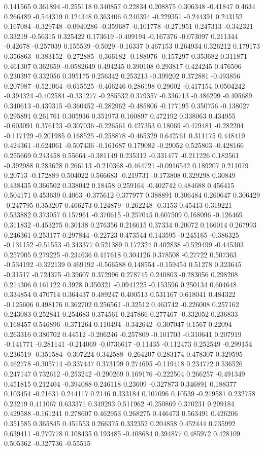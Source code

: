0.141565 0.361894 -0.255118 0.340857 0.22834 0.208875 0.306348 -0.41847 0.4634 0.266489 -0.544319 0.124348 0.363406 0.240394 -0.229351 -0.244391 0.243152 0.167084 -0.329748 -0.0940286 -0.359687 -0.101778 -0.271951 0.247313 -0.342321 0.33219 -0.56315 0.325422 0.173619 -0.409194 -0.167376 -0.073097 0.211344 -0.42678 -0.257039 0.155539 -0.5029 -0.16337 0.467153 0.264934 0.326212 0.179173 0.356863 -0.383152 -0.272885 -0.366182 -0.188076 -0.157297 0.353682 0.311871 0.461307 0.362659 -0.0582649 0.494245 0.390108 0.293817 0.424245 0.476506 0.230397 0.332056 0.395175 0.256342 0.253213 -0.399202 0.372881 -0.493856 0.207987 -0.521064 -0.615525 -0.466246 0.286198 0.29602 -0.417154 0.0504242 -0.394324 -0.402584 -0.331277 -0.285532 0.379357 -0.336713 -0.486299 -0.405689 0.340613 -0.439315 -0.360452 -0.282962 -0.485806 -0.177195 0.350756 -0.138027 0.295891 0.261761 0.305936 0.351973 0.160897 0.472192 0.338063 0.434955 -0.603091 0.376123 -0.307036 -0.226561 0.427353 0.18069 -0.479481 -0.282204 -0.117129 -0.201985 0.168525 -0.258878 -0.465329 0.642761 0.311175 0.448419 0.424361 -0.624061 -0.507436 -0.161687 0.179082 -0.29052 0.525803 -0.428166 0.255669 0.243458 0.55664 -0.381149 0.235312 -0.331477 -0.211226 0.182561 -0.392988 0.283628 0.266113 -0.210368 -0.464721 -0.0916542 0.189207 0.211079 0.20713 -0.172889 0.504022 0.566683 -0.219731 -0.173808 0.329298 0.30849 0.438435 0.366502 0.338042 0.18458 0.259164 -0.402742 0.484688 0.456415 0.504171 0.453639 0.4063 -0.375612 0.377977 0.388891 0.306484 0.260647 0.306429 -0.247795 0.353207 0.466273 0.124879 -0.262248 -0.3153 0.45413 0.319221 0.533882 0.373057 0.157961 -0.370615 -0.257045 0.607509 0.168096 -0.126469 0.311832 -0.453275 0.30138 0.276356 0.216615 0.37334 0.20072 0.166014 0.267993 0.246361 0.253177 0.297844 -0.22723 0.473544 0.143595 -0.245165 -0.386325 -0.131152 -0.51553 -0.343377 0.521389 0.172324 0.402838 -0.529499 -0.445303 0.257905 0.279225 -0.234636 0.417618 0.304126 0.378508 -0.27722 0.507363 -0.534192 -0.322139 0.469192 -0.566588 0.148554 -0.159454 0.51278 0.323645 -0.31517 -0.724375 -0.39607 0.372996 0.278745 0.240803 -0.283056 0.298208 0.214306 0.161122 0.3928 0.350321 -0.0941225 -0.153596 0.250134 0.604648 0.334854 0.470714 0.364437 0.489247 0.400513 0.531167 0.618041 0.484322 -0.125606 0.498176 0.362702 0.256561 -0.32512 0.463742 -0.226008 0.257162 0.243083 0.252841 0.254683 0.374561 0.247866 0.277467 -0.332052 0.236833 0.168457 0.546896 -0.371264 0.110494 -0.342642 -0.307047 0.1567 0.22094 0.263316 0.380702 0.44512 -0.206246 -0.257809 -0.101703 -0.310641 0.207919 -0.141771 -0.281141 -0.214069 -0.0736617 -0.11435 -0.112473 0.252549 -0.299154 0.236519 -0.351584 -0.307224 0.342588 -0.264207 0.283174 0.478307 0.329595 0.462778 -0.305714 -0.337447 0.373199 0.274695 -0.119418 0.234772 0.536526 0.247147 0.732612 -0.253242 -0.290269 0.169176 -0.222504 0.266257 -0.491349 0.451815 0.212404 -0.394088 0.246118 0.23609 -0.327873 0.346891 0.188377 0.103454 -0.21631 0.244117 0.2146 0.333184 0.107096 0.10539 -0.219581 0.232758 0.23219 0.411067 0.633371 0.349293 0.511962 -0.250869 0.370231 0.299184 0.429588 -0.161241 0.278607 0.462953 0.268275 0.446473 0.563491 0.426206 0.351585 0.365845 0.451553 0.266375 0.332352 0.204858 0.452444 0.735992 0.639411 -0.279778 0.108435 0.193485 -0.408684 0.394877 0.485972 0.428109 0.505362 -0.327736 -0.55515 